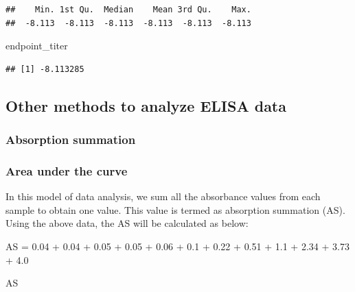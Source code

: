\documentclass[
]{book}
\newenvironment{Shaded}{\begin{snugshade}}{\end{snugshade}}
\newcommand{\FloatTok}[1]{\textcolor[rgb]{0.00,0.00,0.81}{#1}}
\newcommand{\NormalTok}[1]{#1}
\newcommand{\OtherTok}[1]{\textcolor[rgb]{0.56,0.35,0.01}{#1}}
\newcommand{\SpecialCharTok}[1]{\textcolor[rgb]{0.00,0.00,0.00}{#1}}
\begin{document}
\begin{verbatim}
##    Min. 1st Qu.  Median    Mean 3rd Qu.    Max. 
##  -8.113  -8.113  -8.113  -8.113  -8.113  -8.113
\end{verbatim}

\begin{Shaded}
\begin{Highlighting}[]
\NormalTok{endpoint\_titer}
\end{Highlighting}
\end{Shaded}

\begin{verbatim}
## [1] -8.113285
\end{verbatim}

\hypertarget{other-methods-to-analyze-elisa-data}{%
\subsection{Other methods to analyze ELISA data}\label{other-methods-to-analyze-elisa-data}}

\hypertarget{absorption-summation}{%
\subsubsection{Absorption summation}\label{absorption-summation}}

\hypertarget{area-under-the-curve}{%
\subsubsection{Area under the curve}\label{area-under-the-curve}}

In this model of data analysis, we sum all the absorbance values from each sample to obtain one value. This value is termed as absorption summation (AS). Using the above data, the AS will be calculated as below:

\begin{Shaded}
\begin{Highlighting}[]
\NormalTok{AS }\OtherTok{=} \FloatTok{0.04} \SpecialCharTok{+} \FloatTok{0.04} \SpecialCharTok{+} \FloatTok{0.05} \SpecialCharTok{+} \FloatTok{0.05} \SpecialCharTok{+} \FloatTok{0.06} \SpecialCharTok{+} 
  \FloatTok{0.1} \SpecialCharTok{+} \FloatTok{0.22} \SpecialCharTok{+} \FloatTok{0.51} \SpecialCharTok{+} \FloatTok{1.1} \SpecialCharTok{+} \FloatTok{2.34} \SpecialCharTok{+} \FloatTok{3.73} \SpecialCharTok{+} \FloatTok{4.0}

\NormalTok{AS}
\end{Highlighting}
\end{Shaded}
\end{document}
